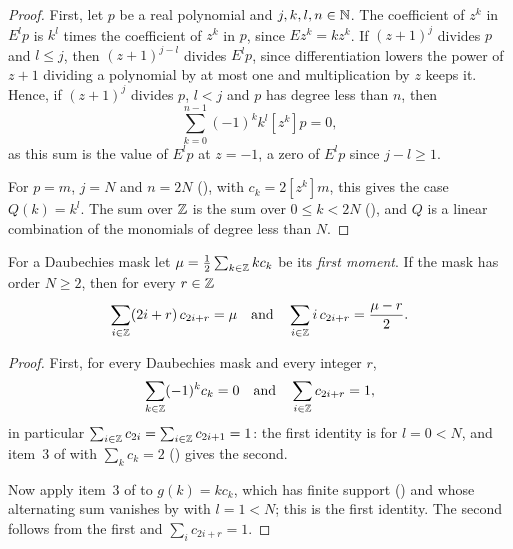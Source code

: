 \begin{proof}
\leanok
{}
First, let $p$ be a real polynomial and $j, k, l, n \in \mathbb{N}$. The coefficient of $z^k$ in
$E^l p$ is $k^l$ times the coefficient of $z^k$ in $p$, since $E z^k = k z^k$. If $(z + 1)^j$
divides $p$ and $l \leq j$, then $(z + 1)^{j-l}$ divides $E^l p$, since differentiation lowers
the power of $z + 1$ dividing a polynomial by at most one and multiplication by $z$ keeps it.
Hence, if $(z + 1)^j$ divides $p$, $l < j$ and $p$ has degree less than $n$, then
\[
  \sum_{k=0}^{n-1} (-1)^k k^l [z^k] p = 0 ,
\]
as this sum is the value of $E^l p$ at $z = -1$, a zero of $E^l p$ since $j - l \geq 1$.

For $p = m$, $j = N$ and $n = 2N$ (), with $c_k = 2 [z^k] m$, this
gives the case $Q(k) = k^l$. The sum over $\mathbb{Z}$ is the sum over $0 \leq k < 2N$
(), and $Q$ is a linear combination of the monomials of degree less
than $N$.
\end{proof}

\begin{proposition}
\label{prop:daub-first-moments}
\leanok
{}
For a Daubechies mask let $\mu = \frac12 \sum_{k \in \mathbb{Z}} k c_k$ be its \emph{first moment}. If
the mask has order $N \geq 2$, then for every $r \in \mathbb{Z}$
\[
  \sum_{i \in \mathbb{Z}} (2i + r) \, c_{2i+r} = \mu
  \quad\text{and}\quad
  \sum_{i \in \mathbb{Z}} i \, c_{2i+r} = \frac{\mu - r}{2} .
\]
\end{proposition}

\begin{proof}
\leanok
{}
First, for every Daubechies mask and every integer $r$,
\[
  \sum_{k \in \mathbb{Z}} (-1)^k c_k = 0 \quad\text{and}\quad \sum_{i \in \mathbb{Z}} c_{2i+r} = 1 ,
\]
in particular $\sum_{i \in \mathbb{Z}} c_{2i} = \sum_{i \in \mathbb{Z}} c_{2i+1} = 1$: the first identity is
 for $l = 0 < N$, and item~3 of  with
$\sum_k c_k = 2$ () gives the second.

Now apply item~3 of  to $g(k) = k c_k$, which has finite support
() and whose alternating sum vanishes by 
with $l = 1 < N$; this is the first identity. The second follows from the first and
$\sum_i c_{2i+r} = 1$.
\end{proof}

